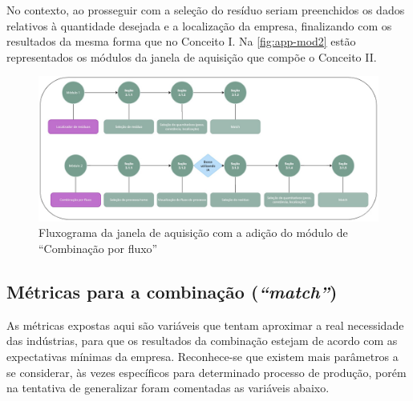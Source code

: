 No contexto, ao prosseguir com a seleção do resíduo seriam preenchidos os dados relativos à quantidade desejada e a localização da empresa, finalizando com os resultados da mesma forma que no Conceito I. Na \autoref{fig:app-mod2} estão representados os módulos da janela de aquisição que compõe o Conceito II.

\begin{figure}[htb]
	\caption{\label{fig:app-mod2} Fluxograma da janela de aquisição com a adição do módulo de “Combinação por fluxo”}
	\begin{center}
		\includegraphics[scale=0.38]{images/app-mod2.jpg}
	\end{center}
\end{figure}


\subsection{Métricas para a combinação (\textit{“match”})}

As métricas expostas aqui são variáveis que tentam aproximar a real necessidade das indústrias, para que os resultados da combinação estejam de acordo com as expectativas mínimas da empresa. Reconhece-se que existem mais parâmetros a se considerar, às vezes específicos para determinado processo de produção, porém na tentativa de generalizar foram comentadas as variáveis abaixo.

